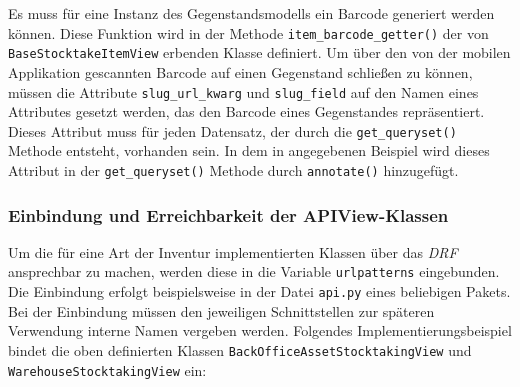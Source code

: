 Es muss für eine Instanz des Gegenstandsmodells ein Barcode generiert
werden können. Diese Funktion wird in der Methode
\texttt{item\_barcode\_getter()} der von \texttt{BaseStocktakeItemView}
erbenden Klasse definiert. Um über den von der mobilen Applikation
gescannten Barcode auf einen Gegenstand schließen zu können, müssen die
Attribute \texttt{slug\_url\_kwarg} und \texttt{slug\_field} auf den
Namen eines Attributes gesetzt werden, das den Barcode eines
Gegenstandes repräsentiert. Dieses Attribut muss für jeden Datensatz,
der durch die \texttt{get\_queryset()} Methode entsteht, vorhanden sein.
In dem in  angegebenen Beispiel wird
dieses Attribut in der \texttt{get\_queryset()} Methode durch
\texttt{annotate()} \cite{django-doku-querysets} hinzugefügt.

\hypertarget{einbindung-und-erreichbarkeit-der-apiview-klassen}{%
\subsubsection{Einbindung und Erreichbarkeit der
APIView-Klassen}\label{einbindung-und-erreichbarkeit-der-apiview-klassen}}

Um die für eine Art der Inventur implementierten Klassen über das
\emph{DRF}
ansprechbar zu machen, werden diese in die Variable \texttt{urlpatterns}
\cite{django-doku-urls} eingebunden. Die Einbindung erfolgt
beispielsweise in der Datei \texttt{api.py} eines beliebigen Pakets. Bei
der Einbindung müssen den jeweiligen Schnittstellen zur späteren
Verwendung interne Namen vergeben werden. Folgendes
Implementierungsbeispiel bindet die oben definierten Klassen
\texttt{BackOfficeAssetStocktakingView} und
\texttt{WarehouseStocktakingView} ein:

\begin{Shaded}
\begin{Highlighting}[]
\OperatorTok{=}\NormalTok{ [}
        \NormalTok{, }
\OperatorTok{=}\NormalTok{),}
        \NormalTok{, }
\OperatorTok{=}\NormalTok{),}
\NormalTok{]}
\end{Highlighting}
\end{Shaded}

